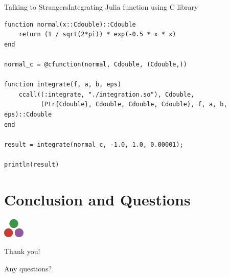\documentclass[11pt]{beamer}
\begin{document}
\begin{frame}[fragile]{Talking to Strangers}{Integrating Julia function using C library}
\begin{lstlisting}[basicstyle=\tiny]
function normal(x::Cdouble)::Cdouble
    return (1 / sqrt(2*pi)) * exp(-0.5 * x * x)
end 

normal_c = @cfunction(normal, Cdouble, (Cdouble,))

function integrate(f, a, b, eps)
    ccall((:integrate, "./integration.so"), Cdouble, 
		  (Ptr{Cdouble}, Cdouble, Cdouble, Cdouble), f, a, b, eps)::Cdouble
end 

result = integrate(normal_c, -1.0, 1.0, 0.00001);

println(result)
\end{lstlisting}
\end{frame}


\section{Conclusion and Questions}
\begin{frame}
\begin{center}
\includegraphics[width=1cm]{images/julia.png}

Thank you!

Any questions? \Coffeecup
\end{center}
\end{frame}
\end{document}
